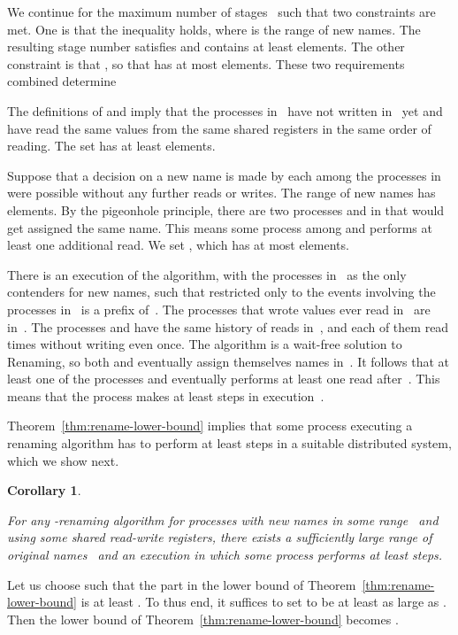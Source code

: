 \documentclass[11pt]{article}
\newcommand{\qed}{\hfill  \smallbreak}
\newenvironment{proof}{\noindent{\bf Proof:}}{\qed}
\newtheorem{corollary}{Corollary}
\begin{document}
\begin{proof}
We continue for the maximum number of stages~  such that two constraints are met.
One is that the inequality  holds, where  is the range of new names.
The resulting stage number  satisfies  and  contains at least  elements.
The other constraint is that , so that  has at most  elements. 
These two requirements combined determine 

The definitions of  and  imply that the processes in~  have not written in~ yet  and have read the same values from the same shared registers in the same order of reading.
The set  has at least  elements.

Suppose that a decision on a new name is made by each among the processes in  were possible without any further reads or writes.
The range of new names has  elements.
By the pigeonhole principle, there are two processes  and  in  that would get assigned  the same name.
This means some process among  and  performs at least one additional read.
We set , which has at most  elements.

There is an execution  of the algorithm, with the processes in~ as the only contenders for new names, such that  restricted only to the events involving the processes in~ is a prefix of~.
The processes that wrote values ever read in~ are in~.
The processes  and  have the same history of reads  in~, and each of them read  times without writing even once.
The algorithm is a wait-free solution to Renaming, so both  and  eventually assign themselves  names in~.
It follows that at least one of the processes  and  eventually performs at least one read  after~.
This means that the process makes at least  steps in execution~.
\end{proof} 

Theorem~\ref{thm:rename-lower-bound} implies that some process executing a renaming algorithm has to perform at least  steps in a suitable distributed system, which we show next.



\begin{corollary}
\label{cor:lower-bound-k-steps}

For any -renaming algorithm for processes with new names in some range~ and using some  shared read-write registers, there exists a sufficiently large range of original names~ and an execution in which some process performs at least  steps.
\end{corollary}

\begin{proof}
Let us choose  such that the part  in the lower bound of Theorem~\ref{thm:rename-lower-bound} is at least .
To thus end, it suffices to set  to be at least as large as .
Then the lower bound of Theorem~\ref{thm:rename-lower-bound} becomes .
\end{proof}
\end{document}
